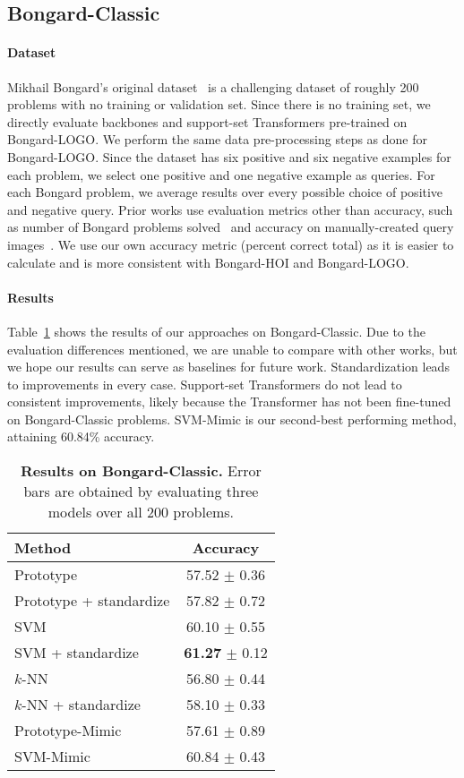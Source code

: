 \subsection{Bongard-Classic}
\paragraph{Dataset} Mikhail Bongard's original dataset~\cite{foundalis, yun2020deeper} is a challenging dataset of roughly 200 problems with no training or validation set. Since there is no training set, we directly evaluate backbones and support-set Transformers pre-trained on Bongard-LOGO. We perform the same data pre-processing steps as done for Bongard-LOGO. Since the dataset has six positive and six negative examples for each problem, we select one positive and one negative example as queries. For each Bongard problem, we average results over every possible choice of positive and negative query. Prior works use evaluation metrics other than accuracy, such as number of Bongard problems solved~\cite{youssef2022solution} and accuracy on manually-created query images~\cite{yun2020deeper}. We use our own accuracy metric (percent correct total) as it is easier to calculate and is more consistent with Bongard-HOI and Bongard-LOGO.

\paragraph{Results} Table~\ref{tab:simple} shows the results of our approaches on Bongard-Classic. Due to the  evaluation differences mentioned, we are unable to compare with other works, but we hope our results can serve as baselines for future work. Standardization leads to improvements in every case. Support-set Transformers do not lead to consistent improvements, likely because 
the Transformer has not been fine-tuned on Bongard-Classic problems. SVM-Mimic is our second-best performing method, attaining 60.84\% accuracy.


\begin{table}
  \centering
    \begin{tabular}{lc}
    \toprule
    Method & Accuracy \\
    \midrule
    Prototype & 57.52 $\pm$ 0.36 \\
    Prototype + standardize & 57.82 $\pm$ 0.72 \\
    SVM & 60.10 $\pm$ 0.55 \\
    SVM + standardize & \textbf{61.27} $\pm$ 0.12 \\
    $k$-NN & 56.80 $\pm$ 0.44 \\
    $k$-NN + standardize & 58.10 $\pm$ 0.33 \\
    Prototype-Mimic & 57.61 $\pm$ 0.89 \\
    SVM-Mimic & 60.84 $\pm$ 0.43 \\
    \bottomrule
  \end{tabular}
    \caption{\textbf{Results on Bongard-Classic.} Error bars are obtained by evaluating three models over all 200 problems.}
  \label{tab:simple}

\end{table}


